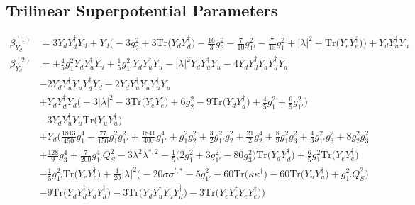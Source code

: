 \subsection{Trilinear Superpotential Parameters}
{\allowdisplaybreaks  \begin{align} 
\beta_{Y_d}^{(1)} & =  
3 {Y_d  Y_{d}^{\dagger}  Y_d}  + Y_d \Big(-3 g_{2}^{2}  + 3 \mbox{Tr}\Big({Y_d  Y_{d}^{\dagger}}\Big)  -\frac{16}{3} g_{3}^{2}  -\frac{7}{10} g_{1'}^{2}  -\frac{7}{15} g_{1}^{2}  + |\lambda|^2 + \mbox{Tr}\Big({Y_e  Y_{e}^{\dagger}}\Big)\Big) + {Y_d  Y_{u}^{\dagger}  Y_u}\\ 
\beta_{Y_d}^{(2)} & =  
+\frac{4}{5} g_{1}^{2} {Y_d  Y_{u}^{\dagger}  Y_u} +\frac{1}{5} g_{1'}^{2} {Y_d  Y_{u}^{\dagger}  Y_u} - |\lambda|^2 {Y_d  Y_{u}^{\dagger}  Y_u} -4 {Y_d  Y_{d}^{\dagger}  Y_d  Y_{d}^{\dagger}  Y_d} \nonumber \\ 
 &-2 {Y_d  Y_{u}^{\dagger}  Y_u  Y_{d}^{\dagger}  Y_d} -2 {Y_d  Y_{u}^{\dagger}  Y_u  Y_{u}^{\dagger}  Y_u} \nonumber \\ 
 &+{Y_d  Y_{d}^{\dagger}  Y_d} \Big(-3 |\lambda|^2  -3 \mbox{Tr}\Big({Y_e  Y_{e}^{\dagger}}\Big)  + 6 g_{2}^{2}  -9 \mbox{Tr}\Big({Y_d  Y_{d}^{\dagger}}\Big)  + \frac{4}{5} g_{1}^{2}  + \frac{6}{5} g_{1'}^{2} \Big)\nonumber \\ 
 &-3 {Y_d  Y_{u}^{\dagger}  Y_u} \mbox{Tr}\Big({Y_u  Y_{u}^{\dagger}}\Big) \nonumber \\ 
 &+Y_d \Big(\frac{1813}{450} g_{1}^{4} -\frac{77}{150} g_{1}^{2} g_{1'}^{2} +\frac{1841}{400} g_{1'}^{4} +g_{1}^{2} g_{2}^{2} +\frac{3}{2} g_{1'}^{2} g_{2}^{2} +\frac{21}{2} g_{2}^{4} +\frac{8}{9} g_{1}^{2} g_{3}^{2} +\frac{4}{3} g_{1'}^{2} g_{3}^{2} +8 g_{2}^{2} g_{3}^{2} \nonumber \\ 
 &+\frac{128}{9} g_{3}^{4} +\frac{7}{200} g_{1'}^{4} Q_{S}^{2} -3 \lambda^{2} \lambda^{*,2} -\frac{1}{5} \Big(2 g_{1}^{2}  + 3 g_{1'}^{2}  -80 g_{3}^{2} \Big)\mbox{Tr}\Big({Y_d  Y_{d}^{\dagger}}\Big) +\frac{6}{5} g_{1}^{2} \mbox{Tr}\Big({Y_e  Y_{e}^{\dagger}}\Big) \nonumber \\ 
 &-\frac{1}{5} g_{1'}^{2} \mbox{Tr}\Big({Y_e  Y_{e}^{\dagger}}\Big) +\frac{1}{20} |\lambda|^2 \Big(-20 \sigma \sigma^{\prime,*}  -5 g_{1'}^{2}  -60 \mbox{Tr}\Big({\kappa  \kappa^{\dagger}}\Big)  -60 \mbox{Tr}\Big({Y_u  Y_{u}^{\dagger}}\Big)  + g_{1'}^{2} Q_{S}^{2} \Big)\nonumber \\ 
 &-9 \mbox{Tr}\Big({Y_d  Y_{d}^{\dagger}  Y_d  Y_{d}^{\dagger}}\Big) -3 \mbox{Tr}\Big({Y_d  Y_{u}^{\dagger}  Y_u  Y_{d}^{\dagger}}\Big) -3 \mbox{Tr}\Big({Y_e  Y_{e}^{\dagger}  Y_e  Y_{e}^{\dagger}}\Big) \Big)\\ 

\end{align}}
